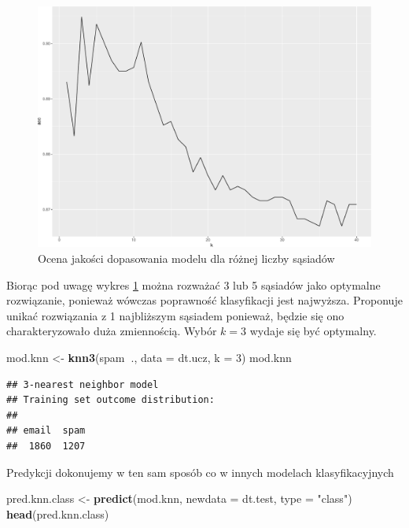 \documentclass[
]{book}
\newenvironment{Shaded}{\begin{snugshade}}{\end{snugshade}}
\newcommand{\DataTypeTok}[1]{\textcolor[rgb]{0.13,0.29,0.53}{#1}}
\newcommand{\DecValTok}[1]{\textcolor[rgb]{0.00,0.00,0.81}{#1}}
\newcommand{\KeywordTok}[1]{\textcolor[rgb]{0.13,0.29,0.53}{\textbf{#1}}}
\newcommand{\NormalTok}[1]{#1}
\newcommand{\OperatorTok}[1]{\textcolor[rgb]{0.81,0.36,0.00}{\textbf{#1}}}
\newcommand{\StringTok}[1]{\textcolor[rgb]{0.31,0.60,0.02}{#1}}
\theoremstyle{plain}
\theoremstyle{definition}
\theoremstyle{definition}
\theoremstyle{definition}
\theoremstyle{definition}
\theoremstyle{remark}
\begin{document}
\begin{figure}

{\centering \includegraphics{EksploracjaDanych_files/figure-latex/knnrys-1} 

}

\caption{Ocena jakości dopasowania modelu dla różnej liczby sąsiadów}\label{fig:knnrys}
\end{figure}

Biorąc pod uwagę wykres \ref{fig:knnrys} można rozważać 3 lub 5 sąsiadów jako optymalne rozwiązanie, ponieważ wówczas poprawność klasyfikacji jest najwyższa. Proponuje unikać rozwiązania z 1 najbliższym sąsiadem ponieważ, będzie się ono charakteryzowało duża zmiennością. Wybór \(k=3\) wydaje się być optymalny.

\begin{Shaded}
\begin{Highlighting}[]
\NormalTok{mod.knn <-}\StringTok{ }\KeywordTok{knn3}\NormalTok{(spam}\OperatorTok{~}\NormalTok{., }\DataTypeTok{data =}\NormalTok{ dt.ucz,}
                \DataTypeTok{k =} \DecValTok{3}\NormalTok{)}
\NormalTok{mod.knn}
\end{Highlighting}
\end{Shaded}

\begin{verbatim}
## 3-nearest neighbor model
## Training set outcome distribution:
## 
## email  spam 
##  1860  1207
\end{verbatim}

Predykcji dokonujemy w ten sam sposób co w innych modelach klasyfikacyjnych

\begin{Shaded}
\begin{Highlighting}[]
\NormalTok{pred.knn.class <-}\StringTok{ }\KeywordTok{predict}\NormalTok{(mod.knn, }\DataTypeTok{newdata =}\NormalTok{ dt.test, }\DataTypeTok{type =} \StringTok{"class"}\NormalTok{)}
\KeywordTok{head}\NormalTok{(pred.knn.class)}
\end{Highlighting}
\end{Shaded}
\end{document}
